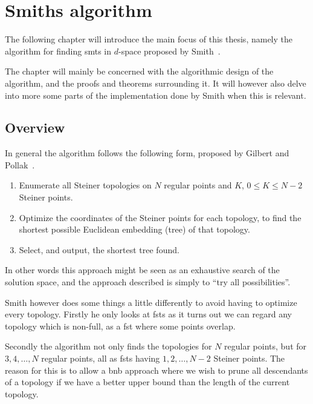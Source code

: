 {
\abnormalparskip{0pt}
\chapter{Smiths algorithm}
\label{cha:algorithm}
}


The following chapter will introduce the main focus of this thesis, namely the
algorithm for finding \glspl{smt} in $d$-space proposed by
Smith~\cite{Smith1992}.

The chapter will mainly be concerned with the algorithmic design of the
algorithm, and the proofs and theorems surrounding it. It will however also
delve into more some parts of the implementation done by Smith when this is
relevant.

\section{Overview}
\label{sec:overview}

In general the algorithm follows the following form, proposed by Gilbert and
Pollak~\cite{Gilbert1968}.

\begin{enumerate}
\item Enumerate all Steiner topologies on $N$ regular points and $K$, $0 \le K
  \le N-2$ Steiner points.
\item Optimize the coordinates of the Steiner points for each topology, to find
  the shortest possible Euclidean embedding (tree) of that topology.
\item Select, and output, the shortest tree found.
\end{enumerate}

In other words this approach might be seen as an exhaustive search of the
solution space, and the approach described is simply to ``try all
possibilities''.

Smith however does some things a little differently to avoid having to optimize
every topology. Firstly he only looks at \glspl{fst} as it turns out we can
regard any topology which is non-full, as a \gls{fst} where some points overlap.

Secondly the algorithm not only finds the topologies for $N$ regular points, but
for $3, 4, \ldots, N$ regular points, all as \glspl{fst} having
$1, 2, \ldots, N-2$ Steiner points. The reason for this is to allow a \gls{bnb}
approach where we wish to prune all descendants of a topology if we have a
better upper bound than the length of the current topology.

